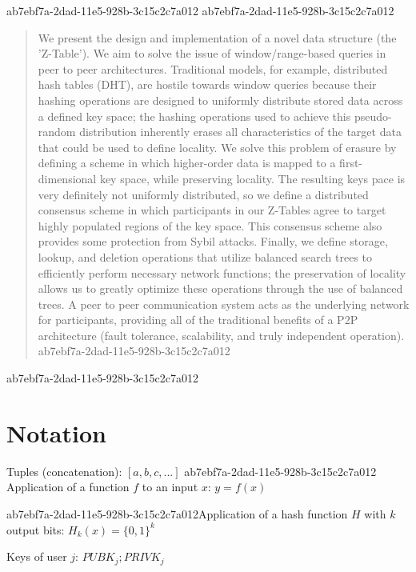 \documentclass[12pt]{article}
\begin{document}
\maketitle
ab7ebf7a-2dad-11e5-928b-3c15c2c7a012
ab7ebf7a-2dad-11e5-928b-3c15c2c7a012\begin{abstract}
We present the design and implementation of a novel data structure (the 'Z-Table'). We aim to solve the issue of window/range-based queries in peer to peer architectures. Traditional models, for example,  distributed hash tables (DHT), are hostile towards window queries because their hashing operations are designed to uniformly distribute stored data across a defined key space; the hashing operations used to achieve this pseudo-random distribution inherently erases all characteristics of the target data that could be used to define locality. We solve this problem of erasure by defining a scheme in which higher-order data is mapped to a first-dimensional key space, while preserving locality. The resulting keys pace is very definitely not uniformly distributed, so we define a distributed consensus scheme in which participants in our Z-Tables agree to target highly populated regions of the key space. This consensus scheme also provides some protection from Sybil attacks. Finally, we define storage, lookup, and deletion operations that utilize balanced search trees to efficiently perform necessary network functions; the preservation of locality allows us to greatly optimize these operations through the use of balanced trees. A peer to peer communication system acts as the underlying network for participants, providing all of the traditional benefits of a P2P architecture (fault tolerance, scalability, and truly independent operation).
ab7ebf7a-2dad-11e5-928b-3c15c2c7a012\end{abstract}
ab7ebf7a-2dad-11e5-928b-3c15c2c7a012
\section{Notation}

Tuples (concatenation): $[a,b,c,...]$
ab7ebf7a-2dad-11e5-928b-3c15c2c7a012
Application of a function $f$ to an input $x$: $y=f(x)$

ab7ebf7a-2dad-11e5-928b-3c15c2c7a012Application of a hash function $H$ with $k$ output bits: $H_{k}(x) = \{0,1\}^k$

Keys of user $j$: $ PUBK_j; PRIVK_j $
\end{document}
